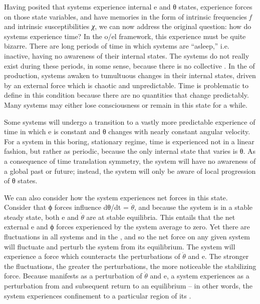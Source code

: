   Having posited that systems experience internal e and θ states, experience forces on those state variables, and have memories in the form of intrinsic frequencies \textit{f} and intrinsic susceptibilities \textit{χ}, we can now address the original question: how do systems experience time? In the o/el framework, this experience must be quite bizarre. There are long periods of time in which systems are “a\-sleep,” i.e. inactive, having no awareness of their internal states. The systems do not really exist during these periods, in some sense, because there is no collective . In the  of production, systems awaken to tumultuous changes in their internal states, driven by an external force which is chaotic and unpredictable. Time is problematic to define in this condition because there are no quantities that change predictably. Many systems may either lose consciousness or remain in this state for a while. 

  Some systems will undergo a transition to a vastly more predictable experience of time in which e is constant and θ changes with nearly constant angular velocity. For a system in this boring, stationary regime, time is experienced not in a linear fashion, but rather as periodic, because the only internal state that varies is θ. As a consequence of time translation symmetry, the system will have no awareness of a global past or future; instead, the system will only be aware of local progression of θ states. 

  We can also consider how the system experiences net forces in this state. Consider that ϕ forces influence  dθ/dt = $\dot{\theta}$, and because the system is in a stable steady state, both e and $\dot{\theta}$ are at stable equilibria. This entails that the net external e and ϕ forces experienced by the system average to zero. Yet there are fluctuations in all systems and in the , and so the net force on any given system will fluctuate and perturb the system from its equilibrium. The system will experience a force which counteracts the perturbations of $\dot{\theta}$ and e. The stronger the fluctuations, the greater the perturbations, the more noticeable the stabilizing force. Because  manifests as a perturbation of $\dot{\theta}$ and e, a system experiences  as a perturbation from and subsequent return to an equilibrium -- in other words, the system experiences confinement to a particular region of its .

